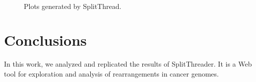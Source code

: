 \documentclass{svproc}
\begin{document}
\begin{figure}[H]
	\centering
	\qquad
	\\
	\caption{Plots generated by SplitThread.}
	\label{fig:copy_number}
\end{figure}





\section{Conclusions} \label{section:conclusions}	

In this work, we analyzed and replicated the results of SplitThreader. It is a Web tool for exploration and analysis of rearrangements in cancer genomes.\\
\end{document}
